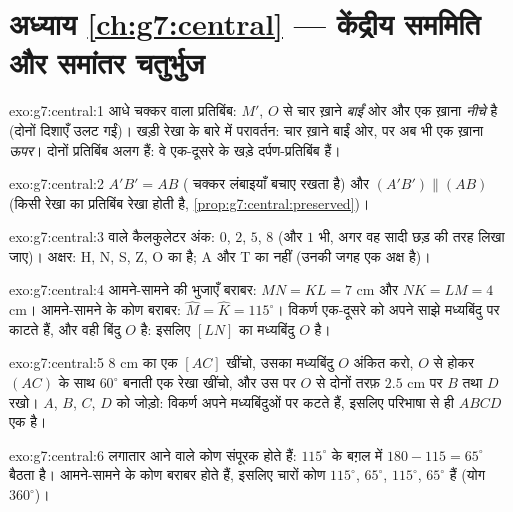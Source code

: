 \section*{अध्याय \ref{ch:g7:central} --- केंद्रीय सममिति और समांतर चतुर्भुज}

\begin{solution}{exo:g7:central:1}
आधे चक्कर वाला प्रतिबिंब: $M'$, $O$ से चार ख़ाने \emph{बाईं} ओर और
एक ख़ाना \emph{नीचे} है (दोनों दिशाएँ उलट गईं)। खड़ी रेखा के बारे
में परावर्तन: चार ख़ाने बाईं ओर, पर अब भी एक ख़ाना \emph{ऊपर}।
दोनों प्रतिबिंब अलग हैं: वे एक-दूसरे के खड़े दर्पण-प्रतिबिंब हैं।
\end{solution}

\begin{solution}{exo:g7:central:2}
$A'B' = AB$ ( चक्कर लंबाइयाँ बचाए रखता है) और
$(A'B') \parallel (AB)$ (किसी रेखा का प्रतिबिंब  रेखा होती है,
\cref{prop:g7:central:preserved})।
\end{solution}

\begin{solution}{exo:g7:central:3}
 वाले कैलकुलेटर अंक: $0$, $2$, $5$, $8$ (और $1$ भी,
अगर वह सादी छड़ की तरह लिखा जाए)। अक्षर: H, N, S, Z, O का  है; A और T का नहीं (उनकी जगह एक अक्ष है)।
\end{solution}

\begin{solution}{exo:g7:central:4}
आमने-सामने की भुजाएँ बराबर: $MN = KL = 7$ cm और $NK = LM = 4$ cm।
आमने-सामने के कोण बराबर: $\widehat M = \widehat K = 115^\circ$।
विकर्ण एक-दूसरे को अपने साझे मध्यबिंदु पर काटते हैं, और वही बिंदु
$O$ है: इसलिए $[LN]$ का मध्यबिंदु $O$ है।
\end{solution}

\begin{solution}{exo:g7:central:5}
$8$ cm का एक  $[AC]$ खींचो, उसका मध्यबिंदु $O$ अंकित करो,
$O$ से होकर $(AC)$ के साथ $60^\circ$ बनाती एक रेखा खींचो, और उस पर
$O$ से दोनों तरफ़ $2.5$ cm पर $B$ तथा $D$ रखो। $A$, $B$, $C$, $D$
को जोड़ो: विकर्ण अपने मध्यबिंदुओं पर कटते हैं, इसलिए परिभाषा से ही
$ABCD$ एक  है।
\end{solution}

\begin{solution}{exo:g7:central:6}
लगातार आने वाले कोण संपूरक होते हैं: $115^\circ$ के बग़ल में
$180 - 115 = 65^\circ$ बैठता है। आमने-सामने के कोण बराबर होते हैं,
इसलिए चारों कोण $115^\circ$, $65^\circ$, $115^\circ$, $65^\circ$
हैं (योग $360^\circ$)।
\end{solution}

